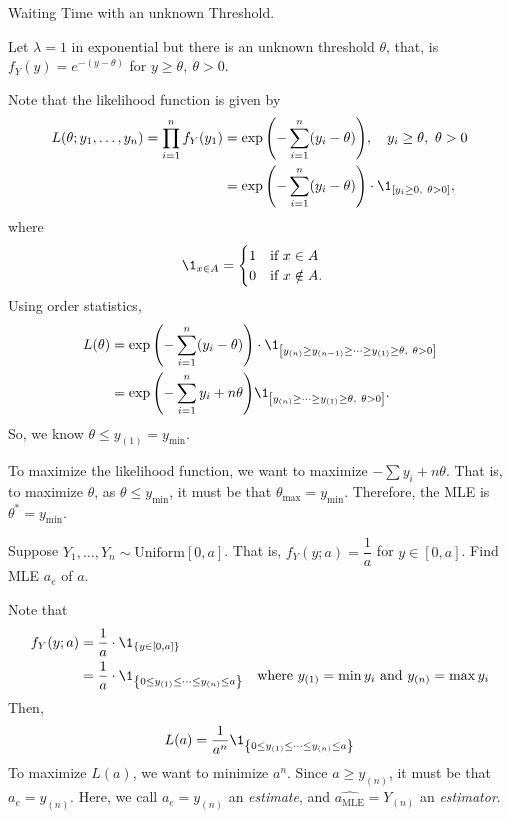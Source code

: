 \begin{eg}
	Waiting Time with an unknown Threshold.\par 
	Let $\lambda=1$ in exponential but there is an unknown threshold $\theta$, that, is $f_Y(y)=e^{-(y-\theta)}$ for $y\geq\theta,\ \theta>0$.	
	\begin{sol}
		Note that the likelihood function is given by \begin{align*}L(\theta;y_1,\dots,y_n)=\prod_{i=1}^nf_Y(y_1)&=\exp\qty(-\sum_{i=1}^n(y_i-\theta)),\quad y_i\geq\theta,\ \theta>0\\&=\exp\qty(-\sum_{i=1}^n(y_i-\theta))\cdot\1_{\qty[y_i\geq0,\ \theta>0]},\end{align*} where \[\1_{x\in A}=\begin{cases}1\quad\text{if }x\in A\\0\quad\text{if }x\notin A.\end{cases}\] Using order statistics, \begin{align*}L(\theta)&=\exp\qty(-\sum_{i=1}^n(y_i-\theta))\cdot\1_{\qty[y_{(n)}\geq y_{(n-1)}\geq\cdots\geq y_{(1)}\geq\theta,\ \theta>0]}\\&=\exp\qty(-\sum_{i=1}^ny_i+n\theta)\1_{\qty[y_{(n)}\geq\cdots\geq y_{(1)}\geq\theta,\ \theta>0]}.\end{align*}
		So, we know $\theta\leq y_{(1)}=y_{\min}$. \par 
		To maximize the likelihood function, we want to maximize $-\sum y_i+n\theta$. That is, to maximize $\theta$, as $\theta\leq y_{\min}$, it must be that $\theta_{\max}=y_{\min}$. Therefore, the MLE is $\theta^*=y_{\min}.$
	\end{sol}
\end{eg}
\begin{eg}
	Suppose $Y_1,\dots,Y_n\sim\text{Uniform}[0,a]$. That is, $f_Y(y;a)=\dfrac{1}{a}$ for $y\in[0,a]$. Find MLE $a_e$ of $a$. 
	\begin{sol}
		Note that \begin{align*}f_Y(y;a)&=\dfrac{1}{a}\cdot\1_{\qty{y\in[0,a]}}\\&=\dfrac{1}{a}\cdot\1_{\qty{0\leq y_{(1)}\leq\cdots\leq y_{(n)}\leq a}}&\text{where } y_{(1)}=\min y_i\text{ and } y_{(n)}=\max y_i\end{align*} Then, \[L(a)=\dfrac{1}{a^n}\1_{\qty{0\leq y_{(1)}\leq\cdots\leq y_{(n)}\leq a}}\] To maximize $L(a)$, we want to minimize $a^n$. Since $a\geq y_{(n)}$, it must be that $a_e=y_{(n)}$. 
		Here, we call $a_e=y_{(n)}$ an \textit{estimate}, and $\hat{a_{\text{MLE}}}=Y_{(n)}$ an \textit{estimator}.
	\end{sol}
\end{eg}
